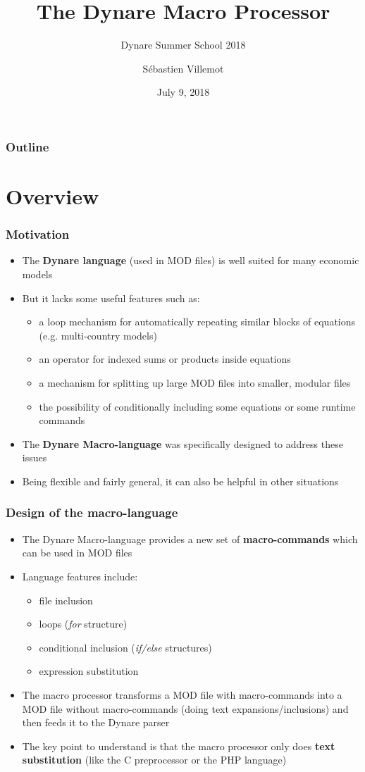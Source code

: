 \documentclass{beamer}
\title{The Dynare Macro Processor}
\subtitle{Dynare Summer School 2018}
\author{Sébastien Villemot}
\institute{CEPREMAP}
\date{July 9, 2018}
\begin{document}
\begin{frame}
  \titlepage
\end{frame}

\begin{frame}
  \frametitle{Outline}
  \tableofcontents
\end{frame}

\section{Overview}

\begin{frame}
  \frametitle{Motivation}
  \begin{itemize}
  \item The \textbf{Dynare language} (used in MOD files) is well suited for many economic models
  \item But it lacks some useful features such as:
    \begin{itemize}
    \item a loop mechanism for automatically repeating similar blocks of equations (e.g. multi-country models)
    \item an operator for indexed sums or products inside equations
    \item a mechanism for splitting up large MOD files into smaller, modular files
    \item the possibility of conditionally including some equations or some runtime commands
  \end{itemize}
  \item The \textbf{Dynare Macro-language} was specifically designed to address these issues
  \item Being flexible and fairly general, it can also be helpful in other situations
  \end{itemize}
\end{frame}

\begin{frame}
  \frametitle{Design of the macro-language}
  \begin{itemize}
  \item The Dynare Macro-language provides a new set of \textbf{macro-commands} which can be used in MOD files
  \item Language features include:
    \begin{itemize}
    \item file inclusion
    \item loops (\textit{for} structure)
    \item conditional inclusion (\textit{if/else} structures)
    \item expression substitution
    \end{itemize}
  \item The macro processor transforms a MOD file with macro-commands into a MOD file without macro-commands (doing text expansions/inclusions) and then feeds it to the Dynare parser
  \item The key point to understand is that the macro processor only does \textbf{text substitution} (like the C preprocessor or the PHP language)
  \end{itemize}
\end{frame}
\end{document}
